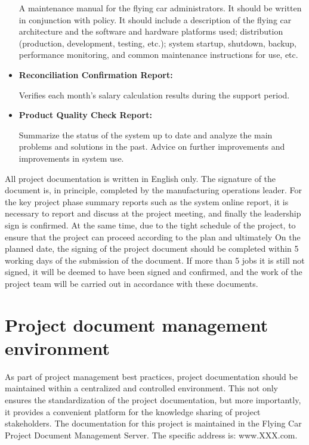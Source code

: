 \begin{itemize}
A maintenance manual for the flying car administrators. It should be written in conjunction with policy. It should include a description of the flying car architecture and the software and hardware platforms used; distribution (production, development, testing, etc.); system startup, shutdown, backup, performance monitoring, and common maintenance instructions for use, etc.

\item \textbf{Reconciliation Confirmation Report:}

Verifies each month's salary calculation results during the support period. 

\item \textbf{Product Quality Check Report:}

Summarize the status of the system up to date and analyze the main problems and solutions in the past. Advice on further improvements and improvements in system use.

\end{itemize}

All project documentation is written in English only. The signature of the document is, in principle, completed by the manufacturing operations leader. For the key project phase summary reports such as the system online report, it is necessary to report and discuss at the project meeting, and finally the leadership sign is confirmed. At the same time, due to the tight schedule of the project, to ensure that the project can proceed according to the plan and ultimately
On the planned date, the signing of the project document should be completed within 5 working days of the submission of the document. If more than 5 jobs it is still not signed, it will be deemed to have been signed and confirmed, and the work of the project team will be carried out in accordance with these documents.

\section{Project document management environment}

As part of project management best practices, project documentation should be maintained within a centralized and controlled environment. This not only ensures the standardization of the project documentation, but more importantly, it provides a convenient platform for the knowledge sharing of project stakeholders. The documentation for this project is maintained in the Flying Car Project Document Management Server. The specific address is: www.XXX.com.